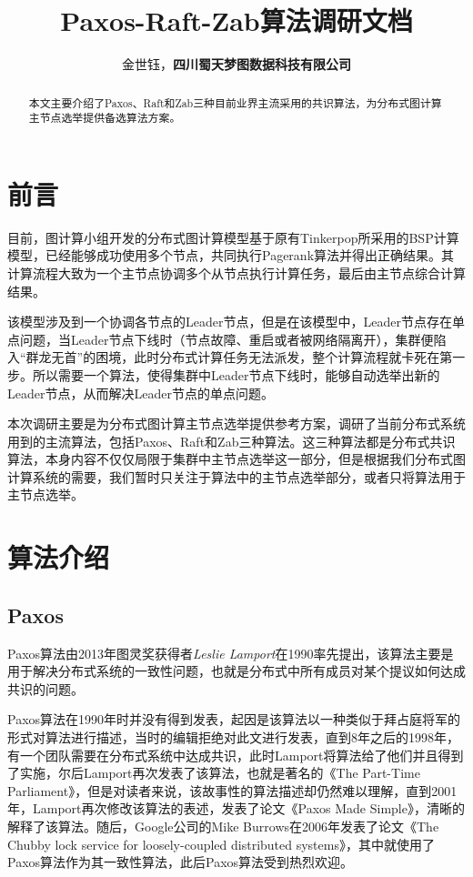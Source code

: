 \documentclass{article}
\title{Paxos-Raft-Zab算法调研文档}
\author{金世钰，\textbf{四川蜀天梦图数据科技有限公司}}
\begin{document}
\maketitle

\begin{abstract}
本文主要介绍了Paxos、Raft和Zab三种目前业界主流采用的共识算法，为分布式图计算主节点选举提供备选算法方案。
\end{abstract}

\section{前言}
目前，图计算小组开发的分布式图计算模型基于原有Tinkerpop所采用的BSP计算模型，已经能够成功使用多个节点，共同执行Pagerank算法并得出正确结果。其计算流程大致为一个主节点协调多个从节点执行计算任务，最后由主节点综合计算结果。


该模型涉及到一个协调各节点的Leader节点，但是在该模型中，Leader节点存在单点问题，当Leader节点下线时（节点故障、重启或者被网络隔离开），集群便陷入“群龙无首”的困境，此时分布式计算任务无法派发，整个计算流程就卡死在第一步。所以需要一个算法，使得集群中Leader节点下线时，能够自动选举出新的Leader节点，从而解决Leader节点的单点问题。

本次调研主要是为分布式图计算主节点选举提供参考方案，调研了当前分布式系统用到的主流算法，包括Paxos、Raft和Zab三种算法。这三种算法都是分布式共识算法，本身内容不仅仅局限于集群中主节点选举这一部分，但是根据我们分布式图计算系统的需要，我们暂时只关注于算法中的主节点选举部分，或者只将算法用于主节点选举。 

\section{算法介绍}

\subsection{Paxos}
Paxos算法由2013年图灵奖获得者\emph{Leslie Lamport}在1990率先提出，该算法主要是用于解决分布式系统的一致性问题，也就是分布式中所有成员对某个提议如何达成共识的问题。

Paxos算法在1990年时并没有得到发表，起因是该算法以一种类似于拜占庭将军的形式对算法进行描述，当时的编辑拒绝对此文进行发表，直到8年之后的1998年，有一个团队需要在分布式系统中达成共识，此时Lamport将算法给了他们并且得到了实施，尔后Lamport再次发表了该算法，也就是著名的《The Part-Time Parliament》，但是对读者来说，该故事性的算法描述却仍然难以理解，直到2001年，Lamport再次修改该算法的表述，发表了论文《Paxos Made Simple》，清晰的解释了该算法。随后，Google公司的Mike Burrows在2006年发表了论文《The Chubby lock service for loosely-coupled distributed systems》，其中就使用了Paxos算法作为其一致性算法，此后Paxos算法受到热烈欢迎。
\end{document}

